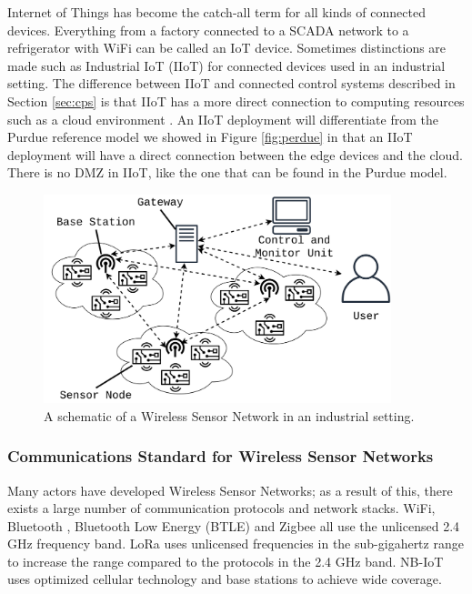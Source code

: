 Internet of Things has become the catch-all term for all kinds of connected devices. Everything from a factory connected to a SCADA network to a refrigerator with WiFi can be called an IoT device. Sometimes distinctions are made such as Industrial IoT (IIoT) for connected devices used in an industrial setting. The difference between IIoT and connected control systems described in Section \ref{sec:cps} is that IIoT has a more direct connection to computing resources such as a cloud environment \cite{mclaughlin2016undiscovered}. An IIoT deployment will differentiate from the Purdue reference model we showed in Figure \ref{fig:perdue} in that an IIoT deployment will have a direct connection between the edge devices and the cloud. There is no DMZ in IIoT, like the one that can be found in the Purdue model.


\begin{figure}[h]
\centering
\includegraphics[width=0.9\textwidth]{images/WSN.png}
\caption{A schematic of a Wireless Sensor Network in an industrial setting.}
\label{fig:wsn}
\end{figure}

\subsubsection{Communications Standard for Wireless Sensor Networks}
Many actors have developed Wireless Sensor Networks; as a result of this, there exists a large number of communication protocols and network stacks. WiFi, Bluetooth \cite{haartsen2000bluetooth}, Bluetooth Low Energy (BTLE) \cite{heydon2012bluetooth} and Zigbee \cite{alliance2010zigbee} all use the unlicensed 2.4 GHz frequency band. LoRa \cite{sornin2015lora} uses unlicensed frequencies in the sub-gigahertz range to increase the range compared to the protocols in the 2.4 GHz band. NB-IoT\cite{ratasuk2016nb} uses optimized cellular technology and base stations to achieve wide coverage.


